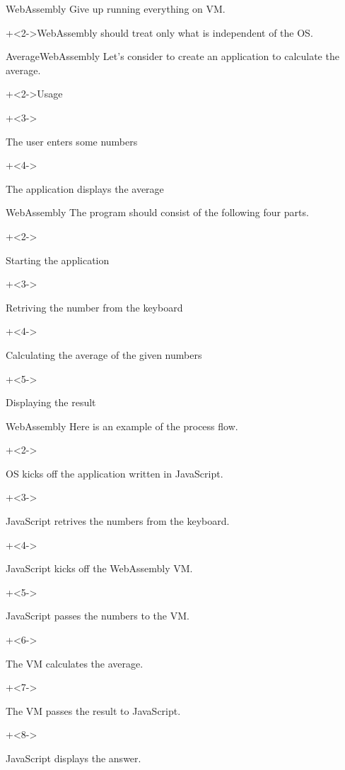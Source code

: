 \begin{frame}{WebAssembly}{}
    Give up running everything on VM.
    \vspace{4ex}

    \onslide+<2->{WebAssembly should treat only what is independent of the OS.}
\end{frame}


\begin{frame}{Average}{WebAssembly}
    Let's consider to create an application to calculate the average.
    \vspace{4ex}

    \onslide+<2->{Usage}
    \vspace{2ex}

    \begin{enumerate}
        \onslide+<3->{\item The user enters some numbers}
        \onslide+<4->{\item The application displays the average}
    \end{enumerate}
\end{frame}


\begin{frame}{WebAssembly}{}
    The program should consist of the following four parts.
    \vspace{2ex}

    \begin{enumerate}
        \onslide+<2->{\item Starting the application}
        \onslide+<3->{\item Retriving the number from the keyboard}
        \onslide+<4->{\item Calculating the average of the given numbers}
        \onslide+<5->{\item Displaying the result}
    \end{enumerate}
\end{frame}



\begin{frame}{WebAssembly}{}
    Here is an example of the process flow.
    \vspace{2ex}

    \begin{enumerate}
        \onslide+<2->{\item OS kicks off the application written in JavaScript.}
        \onslide+<3->{\item JavaScript retrives the numbers from the keyboard.}
        \onslide+<4->{\item JavaScript kicks off the WebAssembly VM.}
        \onslide+<5->{\item JavaScript passes the numbers to the VM.}
        \onslide+<6->{\item The VM calculates the average.}
        \onslide+<7->{\item The VM passes the result to JavaScript.}
        \onslide+<8->{\item JavaScript displays the answer.}
    \end{enumerate}
\end{frame}


